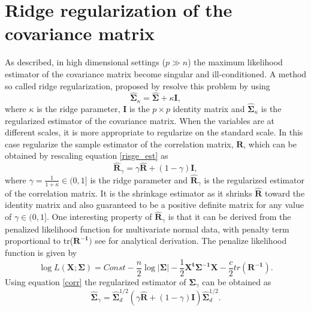 \section{Ridge regularization of the covariance matrix}
As described, in high dimensional settings ($ p \gg n$) the maximum likelihood estimator of the covariance matrix become singular and ill-conditioned. A method so called ridge regularization, proposed by \cite{warton2008penalized} resolve this problem by using 
\begin{equation}
\hat{\boldsymbol{\Sigma}}_{\kappa} = \hat{\boldsymbol{\Sigma}} + \kappa \boldsymbol{I},
\label{risge_est}
\end{equation}
where $\kappa$ is the ridge parameter, $\boldsymbol{I}$ is the $p \times p$ identity matrix and $\hat{\boldsymbol{\Sigma}}_{\kappa}$ is the regularized estimator of the covariance matrix. When the variables are at different scales, it is more appropriate to regularize on the standard scale. In this case \cite{warton2008penalized} regularize the sample estimator of the correlation matrix, $\boldsymbol{R}$, which can be obtained by rescaling equation \ref{risge_est} as 
\begin{equation}
\hat{\boldsymbol{R}}_{\gamma} = \gamma \hat{\boldsymbol{R}} + (1-\gamma) \boldsymbol{I},
\label{corr}
\end{equation}
where $\gamma = \frac{1}{1+\kappa} \in (0,1]$ is the ridge parameter and $\boldsymbol{\hat{R}}_{\gamma}$ is the regularized estimator of the correlation matrix. It is the shrinkage estimator as it shrinks $\boldsymbol{\hat{R}}$ toward the identity matrix and also guaranteed to be a positive definite matrix for any value of $\gamma \in (0,1]$. One interesting property of $\boldsymbol{\hat{R}}_{\gamma}$ is that it can be derived from the penalized likelihood function for multivariate normal data, with penalty term proportional to tr($\boldsymbol{R^{-1}})$ see \citep{warton2008penalized} for analytical derivation. The penalize likelihood function is given by
\begin{equation}
\log L(\boldsymbol{X};\boldsymbol{\Sigma})= Const - \frac{n}{2} \log\left|\boldsymbol{\Sigma}\right|-\frac{1}{2}\boldsymbol{X^t \Sigma^{-1} X} - \frac{c}{2} tr(\boldsymbol{R^{-1}}).
\end{equation}
Using equation \ref{corr} the regularized estimator of $\boldsymbol{\Sigma}_{\gamma}$ can be obtained as
\begin{equation}
\hat{\boldsymbol{\Sigma}}_{\gamma} = \hat{\boldsymbol{\Sigma}}_{d}^{1/2} (\gamma \hat{\boldsymbol{R}} + (1-\gamma) \boldsymbol{I}) \hat{\boldsymbol{\Sigma}}_{d}^{1/2}.
\end{equation}


